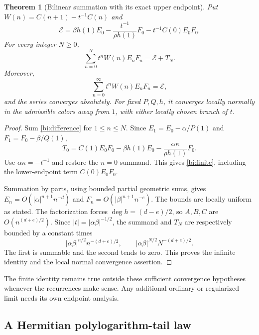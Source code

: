 \documentclass[11pt,letterpaper]{article}
\numberwithin{equation}{section}
\newtheorem{theorem}{Theorem}[section]
\theoremstyle{definition}
\theoremstyle{remark}
\begin{document}
\begin{theorem}[Bilinear summation with its exact upper endpoint]
\label{bi:sum}
Put $W(n)=C(n+1)-t^{-1}C(n)$ and
\begin{equation}\label{bi:endpoint}
 \mathcal E=
 \beta h(1)E_0-\frac{t^{-1}}{\rho h(1)}F_0
                  -t^{-1}C(0)E_0F_0.
\end{equation}
For every integer $N\ge0$,
\begin{equation}\label{bi:finite}
 \sum_{n=0}^N t^n W(n)E_nF_n=\mathcal E+T_N.
\end{equation}
Moreover,
\begin{equation}\label{bi:infinite}
 \boxed{\displaystyle
 \sum_{n=0}^{\infty}t^n W(n)E_nF_n=\mathcal E,}
\end{equation}
and the series converges absolutely. For fixed $P,Q,h$, it converges
locally normally in the admissible colors away from $1$, with either
locally chosen branch of $t$.
\end{theorem}

\begin{proof}
Sum \eqref{bi:difference} for $1\le n\le N$. Since
$E_1=E_0-\alpha/P(1)$ and $F_1=F_0-\beta/Q(1)$,
\[
 T_0=C(1)E_0F_0-\beta h(1)E_0
                         -\frac{\alpha\kappa}{\rho h(1)}F_0.
\]
Use $\alpha\kappa=-t^{-1}$ and restore the $n=0$ summand.
This gives \eqref{bi:finite}, including the lower-endpoint term
$C(0)E_0F_0$.

Summation by parts, using bounded partial geometric sums, gives
$E_n=O(|\alpha|^{n+1}n^{-d})$ and
$F_n=O(|\beta|^{n+1}n^{-e})$. The bounds are locally uniform as
stated. The factorization forces $\deg h=(d-e)/2$, so $A,B,C$
are $O(n^{(d+e)/2})$. Since $|t|=|\alpha\beta|^{-1/2}$,
the summand and $T_N$ are respectively bounded by a constant times
\[
 |\alpha\beta|^{n/2}n^{-(d+e)/2},\qquad
 |\alpha\beta|^{N/2}N^{-(d+e)/2}.
\]
The first is summable and the second tends to zero. This proves the
infinite identity and the local normal convergence assertion.
\end{proof}

The finite identity remains true outside these sufficient convergence
hypotheses whenever the recurrences make sense. Any additional ordinary
or regularized limit needs its own endpoint analysis.

\subsection{A Hermitian polylogarithm-tail law}
\end{document}
